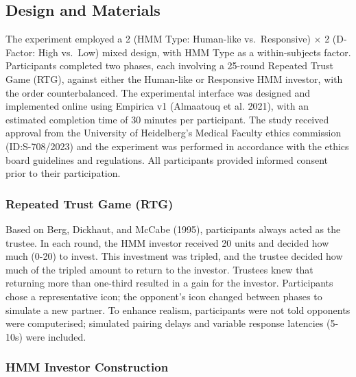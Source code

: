 \documentclass[
]{article}
\begin{document}
\subsection{Design and Materials}\label{design-and-materials}

The experiment employed a 2 (HMM Type: Human-like vs.~Responsive) × 2 (D-Factor: High vs.~Low) mixed design, with HMM Type as a within-subjects factor. Participants completed two phases, each involving a 25-round Repeated Trust Game (RTG), against either the Human-like or Responsive HMM investor, with the order counterbalanced.
The experimental interface was designed and implemented online using Empirica v1 (Almaatouq et al. 2021), with an estimated completion time of 30 minutes per participant. The study received approval from the University of Heidelberg's Medical Faculty ethics commission (ID:S-708/2023) and the experiment was performed in accordance with the ethics board guidelines and regulations. All participants provided informed consent prior to their participation.

\subsubsection{Repeated Trust Game (RTG)}\label{repeated-trust-game-rtg}

Based on Berg, Dickhaut, and McCabe (1995), participants always acted as the trustee. In each round, the HMM investor received 20 units and decided how much (0-20) to invest. This investment was tripled, and the trustee decided how much of the tripled amount to return to the investor. Trustees knew that returning more than one-third resulted in a gain for the investor. Participants chose a representative icon; the opponent's icon changed between phases to simulate a new partner. To enhance realism, participants were not told opponents were computerised; simulated pairing delays and variable response latencies (5-10s) were included.

\subsubsection{HMM Investor Construction}\label{hmm-investor-construction}
\end{document}
